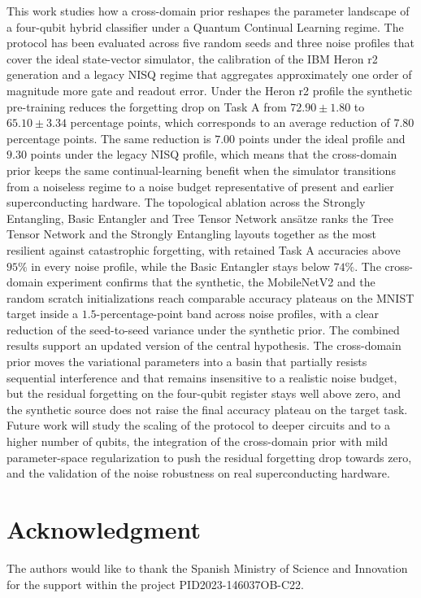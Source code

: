 \documentclass[conference]{IEEEtran}
\begin{document}
This work studies how a cross-domain prior reshapes the parameter landscape of a four-qubit hybrid classifier under a Quantum Continual Learning regime. The protocol has been evaluated across five random seeds and three noise profiles that cover the ideal state-vector simulator, the calibration of the IBM Heron r2 generation and a legacy NISQ regime that aggregates approximately one order of magnitude more gate and readout error. Under the Heron r2 profile the synthetic pre-training reduces the forgetting drop on Task A from $72.90 \pm 1.80$ to $65.10 \pm 3.34$ percentage points, which corresponds to an average reduction of $7.80$ percentage points. The same reduction is $7.00$ points under the ideal profile and $9.30$ points under the legacy NISQ profile, which means that the cross-domain prior keeps the same continual-learning benefit when the simulator transitions from a noiseless regime to a noise budget representative of present and earlier superconducting hardware. The topological ablation across the Strongly Entangling, Basic Entangler and Tree Tensor Network ans\"atze ranks the Tree Tensor Network and the Strongly Entangling layouts together as the most resilient against catastrophic forgetting, with retained Task A accuracies above $95\%$ in every noise profile, while the Basic Entangler stays below $74\%$. The cross-domain experiment confirms that the synthetic, the MobileNetV2 and the random scratch initializations reach comparable accuracy plateaus on the MNIST target inside a $1.5$-percentage-point band across noise profiles, with a clear reduction of the seed-to-seed variance under the synthetic prior. The combined results support an updated version of the central hypothesis. The cross-domain prior moves the variational parameters into a basin that partially resists sequential interference and that remains insensitive to a realistic noise budget, but the residual forgetting on the four-qubit register stays well above zero, and the synthetic source does not raise the final accuracy plateau on the target task. Future work will study the scaling of the protocol to deeper circuits and to a higher number of qubits, the integration of the cross-domain prior with mild parameter-space regularization to push the residual forgetting drop towards zero, and the validation of the noise robustness on real superconducting hardware.

\section*{Acknowledgment}

The authors would like to thank the Spanish Ministry of Science and Innovation for the support within the project PID2023-146037OB-C22.



\end{document}
